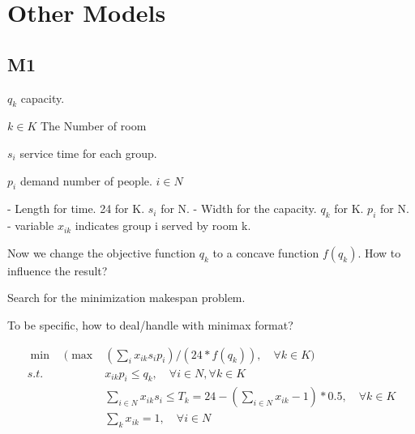 \section{Other Models}
\subsection{M1}
$q_k$ capacity. 

$k\in K$  The Number of room

$s_i$ service time for each group.

$p_i$ demand number of people.  $i \in N$

- Length for time.          24 for K. $s_i$ for N.
- Width for the capacity.   $q_k$ for K. $p_i$  for N.
- variable $x_{ik}$ indicates group i served by room k.

Now we change the objective function $q_k$ to a concave function $f(q_k)$. How to influence the result?

Search for the minimization makespan problem. 

To be specific, how to deal/handle with minimax format?




$$
\begin{aligned}
\min \quad (\max & (\sum_i { x_{ik} s_i p_i})/(24 * f(q_k)),\quad \forall k \in K) \\
s.t. \quad  & x_{ik} p_i \leq q_k,\quad  \forall i \in N, \forall k \in K  \\
& \sum_{i\in N} x_{ik} s_i \leq T_k = 24 - (\sum_{i\in N} x_{ik} - 1)*0.5,\quad \forall k \in K \\
& \sum_{k} x_{ik} =1,\quad \forall i \in N
\end{aligned}$$

